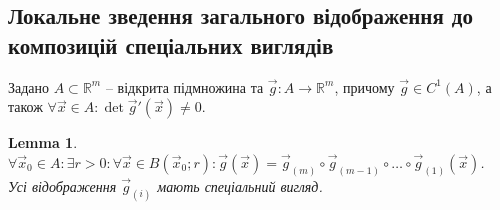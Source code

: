 \documentclass[a4paper, 10pt]{article}
\theoremstyle{theoremdd}
\theoremstyle{theoremdd}
\theoremstyle{theoremdd}
\theoremstyle{theoremdd}
\theoremstyle{theoremdd}
\theoremstyle{theoremdd}
\theoremstyle{theoremdd}
\newtheorem{lemma}[theorem]{Lemma}
\theoremstyle{theoremdd}
\begin{document}
\subsection{Локальне зведення загального відображення до композицій спеціальних виглядів}
Задано $A \subset \mathbb{R}^m$ -- відкрита підмножина та $\vec{g} \colon A \to \mathbb{R}^m$, причому $\vec{g} \in C^1(A)$, а також $\forall \vec{x} \in A: \det \vec{g}'(\vec{x}) \neq 0$.

\begin{lemma}
$\forall \vec{x}_0 \in A: \exists r > 0: \forall \vec{x} \in B(\vec{x}_0;r): \vec{g}(\vec{x}) = \vec{g}_{(m)} \circ \vec{g}_{(m-1)} \circ \dots \circ \vec{g}_{(1)}(\vec{x})$.\\
Усі відображення $\vec{g}_{(i)}$ мають спеціальний вигляд.
\end{lemma}
\end{document}
